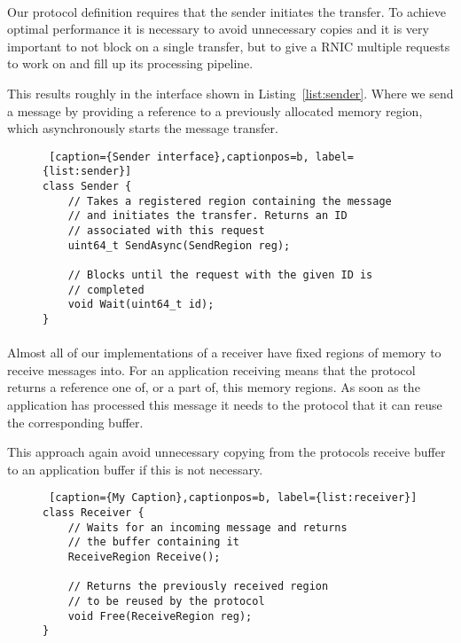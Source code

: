 \paragraph{} Our protocol definition requires that the sender initiates the transfer. To achieve optimal performance it is
necessary to avoid unnecessary copies and it is very important to not block on a single transfer, but to give a RNIC multiple
requests to work on and fill up its processing pipeline. 

This results roughly in the interface shown in Listing~\ref{list:sender}. Where we send a message by providing a reference
to a previously allocated memory region, which asynchronously starts the message transfer. 

\begin{figure}[htp]
\begin{lstlisting} [caption={Sender interface},captionpos=b, label={list:sender}] 
class Sender {
    // Takes a registered region containing the message
    // and initiates the transfer. Returns an ID 
    // associated with this request
    uint64_t SendAsync(SendRegion reg);

    // Blocks until the request with the given ID is
    // completed
    void Wait(uint64_t id);
}
\end{lstlisting}
\end{figure}

\paragraph{} Almost all of our implementations of a receiver have fixed regions of memory to receive messages into. For an application 
receiving means that the protocol returns a reference one of, or a part of, this memory regions. As soon as the application 
has processed this message it needs to the protocol that it can reuse the corresponding buffer.

This approach again avoid unnecessary copying from the protocols receive buffer to an application buffer if this is not 
necessary.

\begin{figure}[htp]
\begin{lstlisting} [caption={My Caption},captionpos=b, label={list:receiver}] 
class Receiver {
    // Waits for an incoming message and returns
    // the buffer containing it
    ReceiveRegion Receive();

    // Returns the previously received region 
    // to be reused by the protocol
    void Free(ReceiveRegion reg);
}
\end{lstlisting}
\end{figure}

